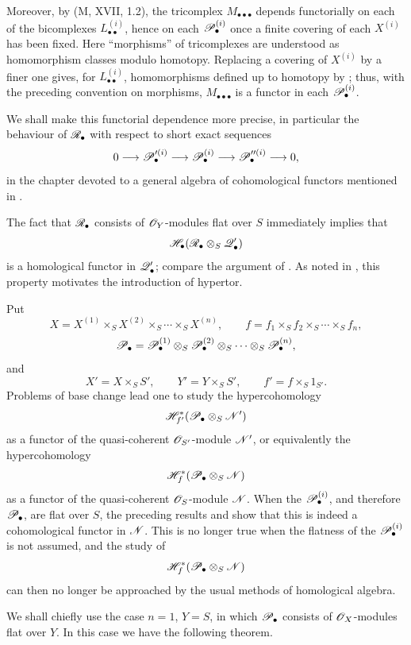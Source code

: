 \begin{remarks}[6.10.3]
Moreover, by (M, XVII, 1.2), the tricomplex
$M_{\bullet\bullet\bullet}$ depends functorially on each of the
bicomplexes $L_{\bullet\bullet}^{(i)}$, hence on each
$\mathscr{P}_\bullet^{(i)}$ once a finite covering of each
$X^{(i)}$ has been fixed.  Here ``morphisms'' of tricomplexes
are understood as homomorphism classes modulo homotopy.
Replacing a covering of $X^{(i)}$ by a finer one gives, for
$L_{\bullet\bullet}^{(i)}$, homomorphisms defined up to homotopy
by ; thus, with the preceding convention on
morphisms, $M_{\bullet\bullet\bullet}$ is a functor in each
$\mathscr{P}_\bullet^{(i)}$.

We shall make this functorial dependence more precise, in
particular the behaviour of $\mathscr{R}_\bullet$ with respect to
short exact sequences
\[
  0\longrightarrow\mathscr{P}_\bullet^{\prime(i)}
  \longrightarrow\mathscr{P}_\bullet^{(i)}
  \longrightarrow\mathscr{P}_\bullet^{\prime\prime(i)}
  \longrightarrow0,
\]
in the chapter devoted to a general algebra of cohomological
functors mentioned in .
\end{remarks}

\begin{scholium}[6.10.4]
\label{III.6.10.4}
The fact that $\mathscr{R}_\bullet$ consists of $\mathscr{O}_Y$-modules
flat over $S$ immediately implies that
\[
  \mathscr{H}_\bullet
  (\mathscr{R}_\bullet\otimes_S\mathscr{Q}_\bullet')
\]
is a homological functor in $\mathscr{Q}_\bullet'$; compare the
argument of .  As noted in
, this property motivates the introduction of
hypertor.

Put
\[
  X=X^{(1)}\times_SX^{(2)}\times_S\cdots\times_SX^{(n)},
  \qquad
  f=f_1\times_Sf_2\times_S\cdots\times_Sf_n,
\]
\[
  \mathscr{P}_\bullet
  =
  \mathscr{P}_\bullet^{(1)}
  \otimes_S\mathscr{P}_\bullet^{(2)}
  \otimes_S\cdots\otimes_S\mathscr{P}_\bullet^{(n)},
\]
and
\[
  X'=X\times_SS',
  \qquad
  Y'=Y\times_SS',
  \qquad
  f'=f\times_S1_{S'}.
\]
Problems of base change lead one to study the hypercohomology
\[
  \mathscr{H}^*_{f'}
  (\mathscr{P}_\bullet\otimes_S\mathscr{N}')
\]
as a functor of the quasi-coherent $\mathscr{O}_{S'}$-module
$\mathscr{N}'$, or equivalently the hypercohomology
\[
  \mathscr{H}^*_f
  (\mathscr{P}_\bullet\otimes_S\mathscr{N})
\]
as a functor of the quasi-coherent $\mathscr{O}_S$-module $\mathscr{N}$.
When the $\mathscr{P}_\bullet^{(i)}$, and therefore
$\mathscr{P}_\bullet$, are flat over $S$, the preceding results and
 show that this is indeed a cohomological
functor in $\mathscr{N}$.  This is no longer true when the flatness
of the $\mathscr{P}_\bullet^{(i)}$ is not assumed, and the study of
\[
  \mathscr{H}^*_f(\mathscr{P}_\bullet\otimes_S\mathscr{N})
\]
can then no longer be approached by the usual methods of
homological algebra.

We shall chiefly use the case $n=1$, $Y=S$, in which
$\mathscr{P}_\bullet$ consists of $\mathscr{O}_X$-modules flat over $Y$.
In this case we have the following theorem.
\end{scholium}


